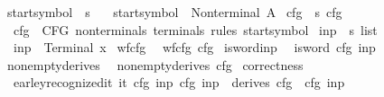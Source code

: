 \begin{isabellebody}
\ start{\isacharunderscore}{\kern0pt}symbol{}\ {\isacharcolon}{\kern0pt}{\isacharcolon}{\kern0pt}\ s{}\ \isanewline
\ \ {\isachardoublequoteopen}start{\isacharunderscore}{\kern0pt}symbol{}\ {\isacharequal}{\kern0pt}\ Nonterminal\ A{\isachardoublequoteclose}\isanewline
\isanewline
{}\isamarkupfalse%
\ cfg{}\ {\isacharcolon}{\kern0pt}{\isacharcolon}{\kern0pt}\ {\isachardoublequoteopen}s{}\ cfg{\isachardoublequoteclose}\ \isanewline
\ \ {\isachardoublequoteopen}cfg{}\ {\isacharequal}{\kern0pt}\ CFG\ nonterminals{}\ terminals{}\ rules{}\ start{\isacharunderscore}{\kern0pt}symbol{}{\isachardoublequoteclose}\isanewline
\isanewline
{}\isamarkupfalse%
\ inp{}\ {\isacharcolon}{\kern0pt}{\isacharcolon}{\kern0pt}\ {\isachardoublequoteopen}s{}\ list{\isachardoublequoteclose}\ \isanewline
\ \ {\isachardoublequoteopen}inp{}\ {\isacharequal}{\kern0pt}\ {\isacharbrackleft}{\kern0pt}Terminal\ x{\isacharbrackright}{\kern0pt}{\isachardoublequoteclose}\isanewline
\isanewline
{}\isamarkupfalse%
\ wf{\isacharunderscore}{\kern0pt}cfg{}{\isacharcolon}{\kern0pt}\isanewline
\ \ {\isachardoublequoteopen}wf{\isacharunderscore}{\kern0pt}cfg\ cfg{}{\isachardoublequoteclose}%
\isadelimproof
%
\endisadelimproof
%
\isatagproof
%
\endisatagproof
{\isafoldproof}%
%
\isadelimproof
\isanewline
%
\endisadelimproof
{}\isamarkupfalse%
\ is{\isacharunderscore}{\kern0pt}word{\isacharunderscore}{\kern0pt}inp{}{\isacharcolon}{\kern0pt}\isanewline
\ \ {\isachardoublequoteopen}is{\isacharunderscore}{\kern0pt}word\ cfg{}\ inp{}{\isachardoublequoteclose}%
\isadelimproof
%
\endisadelimproof
%
\isatagproof
%
\endisatagproof
{\isafoldproof}%
%
\isadelimproof
\isanewline
%
\endisadelimproof
{}\isamarkupfalse%
\ nonempty{\isacharunderscore}{\kern0pt}derives{}{\isacharcolon}{\kern0pt}\isanewline
\ \ {\isachardoublequoteopen}nonempty{\isacharunderscore}{\kern0pt}derives\ cfg{}{\isachardoublequoteclose}%
\isadelimproof
%
\endisadelimproof
%
\isatagproof
%
\endisatagproof
{\isafoldproof}%
%
\isadelimproof
\isanewline
%
\endisadelimproof
{}\isamarkupfalse%
\ correctness{}{\isacharcolon}{\kern0pt}\isanewline
\ \ {\isachardoublequoteopen}earley{\isacharunderscore}{\kern0pt}recognized{\isacharunderscore}{\kern0pt}it\ {\isacharparenleft}{\kern0pt}{\isasymII}{\isacharunderscore}{\kern0pt}it\ cfg{}\ inp{}{\isacharparenright}{\kern0pt}\ cfg{}\ inp{}\ {\isasymlongleftrightarrow}\ derives\ cfg{}\ {\isacharbrackleft}{\kern0pt}{\isasymSS}\ cfg{}{\isacharbrackright}{\kern0pt}\ inp{}{\isachardoublequoteclose}%

\end{isabellebody}

